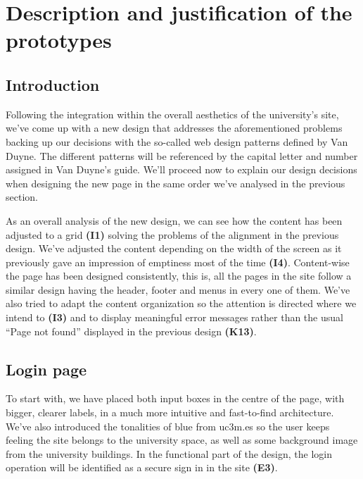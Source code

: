\documentclass{article}
\begin{document}
\newpage



\section{Description and justification	of the prototypes}
\subsection{Introduction}
Following the integration within the overall aesthetics of the university’s site, we’ve come up with a new design that addresses the aforementioned problems backing up our decisions with the so-called web design patterns defined by Van Duyne. The different patterns will be referenced by the capital letter and number assigned in Van Duyne’s guide.
We’ll proceed now to explain our design decisions when designing the new page in the same order we’ve analysed in the previous section.

As an overall analysis of the new design, we can see how the content has been adjusted to a grid \textbf{(I1)} solving the problems of the alignment in the previous design. We’ve adjusted the content depending on the width of the screen as it previously gave an impression of emptiness most of the time \textbf{(I4)}. Content-wise the page has been designed consistently, this is, all the pages in the site follow a similar design having the header, footer and menus in every one of them. We’ve also tried to adapt the content organization so the attention is directed where we intend to \textbf{(I3)} and to display meaningful error messages rather than the usual “Page not found” displayed in the previous design \textbf{(K13)}.

\subsection{Login page}

To start with, we have placed both input boxes in the centre of the page, with bigger, clearer labels, in a much more intuitive and fast-to-find architecture. We’ve also introduced the tonalities of blue from uc3m.es so the user keeps feeling the site belongs to the university space, as well as some background image from the university buildings. In the functional part of the design, the login operation will be identified as a secure sign in in the site \textbf{(E3)}. 
\end{document}
